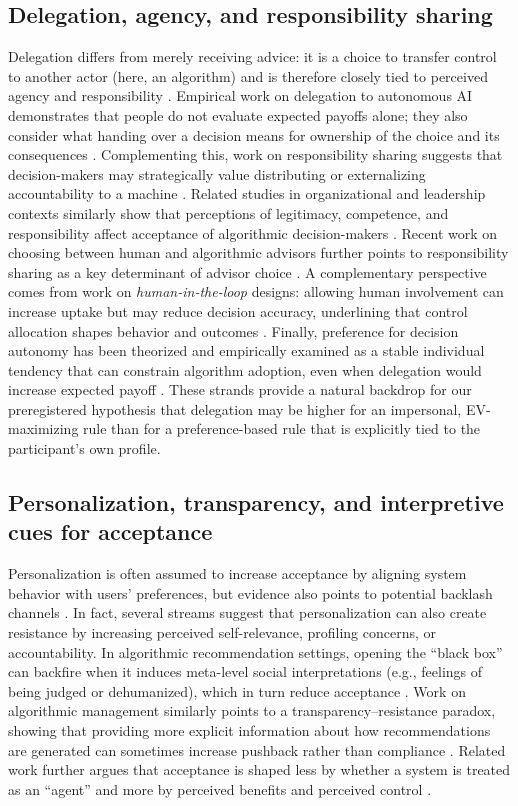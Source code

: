 \documentclass[a4paper, 12pt, fleqn]{article}
\theoremstyle{definition}
\begin{document}
\subsection{Delegation, agency, and responsibility sharing}
Delegation differs from merely receiving advice: it is a choice to transfer control to another actor (here, an algorithm) and is therefore closely tied to perceived agency and responsibility \citep{Candrian2022,Kirchkamp2019}. Empirical work on delegation to autonomous AI demonstrates that people do not evaluate expected payoffs alone; they also consider what handing over a decision means for ownership of the choice and its consequences \citep{Candrian2022}. Complementing this, work on responsibility sharing suggests that decision-makers may strategically value distributing or externalizing accountability to a machine \citep{Kirchkamp2019}. Related studies in organizational and leadership contexts similarly show that perceptions of legitimacy, competence, and responsibility affect acceptance of algorithmic decision-makers \citep{Hoeddinghaus2021}. Recent work on choosing between human and algorithmic advisors further points to responsibility sharing as a key determinant of advisor choice \citep{Gazit2023}. A complementary perspective comes from work on \emph{human-in-the-loop} designs: allowing human involvement can increase uptake but may reduce decision accuracy, underlining that control allocation shapes behavior and outcomes \citep{Sele2024}. Finally, preference for decision autonomy has been theorized and empirically examined as a stable individual tendency that can constrain algorithm adoption, even when delegation would increase expected payoff \citep{Ivanova-Stenzel2025}. These strands provide a natural backdrop for our preregistered hypothesis that delegation may be higher for an impersonal, EV-maximizing rule than for a preference-based rule that is explicitly tied to the participant's own profile.

\subsection{Personalization, transparency, and interpretive cues for acceptance}
Personalization is often assumed to increase acceptance by aligning system behavior with users' preferences, but evidence also points to potential backlash channels \citep{Chen2024,Hu2024}. In fact, several streams suggest that personalization can also create resistance by increasing perceived self-relevance, profiling concerns, or accountability. In algorithmic recommendation settings, opening the ``black box'' can backfire when it induces meta-level social interpretations (e.g., feelings of being judged or dehumanized), which in turn reduce acceptance \citep{Chen2024}. Work on algorithmic management similarly points to a transparency--resistance paradox, showing that providing more explicit information about how recommendations are generated can sometimes increase pushback rather than compliance \citep{Hu2024}. Related work further argues that acceptance is shaped less by whether a system is treated as an ``agent'' and more by perceived benefits and perceived control \citep{Schaap2024}.
\end{document}
